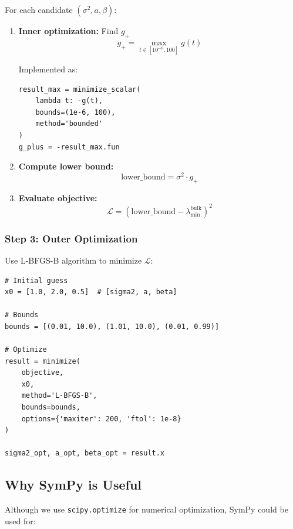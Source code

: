 \documentclass[12pt,a4paper]{article}
\begin{document}
For each candidate $(\sigma^2, a, \beta)$:

\begin{enumerate}
    \item \textbf{Inner optimization:} Find $g_+$
    \begin{equation}
    g_+ = \max_{t \in [10^{-6}, 100]} g(t)
    \end{equation}

    Implemented as:
    \begin{verbatim}
result_max = minimize_scalar(
    lambda t: -g(t),
    bounds=(1e-6, 100),
    method='bounded'
)
g_plus = -result_max.fun
    \end{verbatim}

    \item \textbf{Compute lower bound:}
    \begin{equation}
    \text{lower\_bound} = \sigma^2 \cdot g_+
    \end{equation}

    \item \textbf{Evaluate objective:}
    \begin{equation}
    \mathcal{L} = (\text{lower\_bound} - \lambda_{\min}^{\text{bulk}})^2
    \end{equation}
\end{enumerate}

\subsubsection{Step 3: Outer Optimization}

Use L-BFGS-B algorithm to minimize $\mathcal{L}$:

\begin{verbatim}
# Initial guess
x0 = [1.0, 2.0, 0.5]  # [sigma2, a, beta]

# Bounds
bounds = [(0.01, 10.0), (1.01, 10.0), (0.01, 0.99)]

# Optimize
result = minimize(
    objective,
    x0,
    method='L-BFGS-B',
    bounds=bounds,
    options={'maxiter': 200, 'ftol': 1e-8}
)

sigma2_opt, a_opt, beta_opt = result.x
\end{verbatim}

\subsection{Why SymPy is Useful}

Although we use \texttt{scipy.optimize} for numerical optimization, SymPy could be used for:
\end{document}
